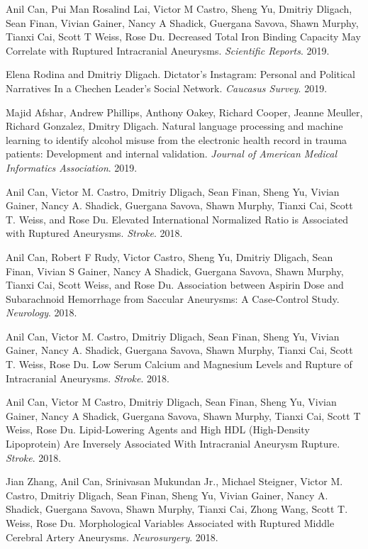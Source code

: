 \documentclass[letterpaper]{article}
\renewenvironment{itemize}{
  \begin{list}{}{
    \setlength{\leftmargin}{1.5em}
  }
}{
  \end{list}
}
\begin{document}
\begin{itemize}
\item Anil Can, Pui Man Rosalind Lai, Victor M Castro, Sheng Yu, Dmitriy Dligach, Sean Finan, Vivian Gainer, Nancy A Shadick, Guergana Savova, Shawn Murphy, Tianxi Cai, Scott T Weiss, Rose Du. Decreased Total Iron Binding Capacity May Correlate with Ruptured Intracranial Aneurysms. \emph{Scientific Reports}. 2019.
\item Elena Rodina and Dmitriy Dligach. Dictator's Instagram: Personal and Political Narratives In a Chechen Leader's Social Network. \emph{Caucasus Survey}. 2019.
\item Majid Afshar, Andrew Phillips, Anthony Oakey, Richard Cooper, Jeanne Meuller, Richard Gonzalez, Dmitry Dligach. Natural language processing and machine learning to identify alcohol misuse from the electronic health record in trauma patients: Development and internal validation. \emph{Journal of American Medical Informatics Association}. 2019.
\item Anil Can, Victor M. Castro, Dmitriy Dligach, Sean Finan, Sheng Yu, Vivian Gainer, Nancy A. Shadick, Guergana Savova, Shawn Murphy, Tianxi Cai, Scott T. Weiss, and Rose Du. Elevated International Normalized Ratio is Associated with Ruptured Aneurysms. \emph{Stroke}. 2018.
\item Anil Can, Robert F Rudy, Victor Castro, Sheng Yu, Dmitriy Dligach, Sean Finan, Vivian S Gainer, Nancy A Shadick, Guergana Savova, Shawn Murphy, Tianxi Cai, Scott Weiss, and Rose Du. Association between Aspirin Dose and Subarachnoid Hemorrhage from Saccular Aneurysms: A Case-Control Study. \emph{Neurology}. 2018.
\item Anil Can, Victor M. Castro, Dmitriy Dligach, Sean Finan, Sheng Yu, Vivian Gainer, Nancy A. Shadick, Guergana Savova, Shawn Murphy, Tianxi Cai, Scott T. Weiss, Rose Du. Low Serum Calcium and Magnesium Levels and Rupture of Intracranial Aneurysms. \emph{Stroke}. 2018.
\item Anil Can, Victor M Castro, Dmitriy Dligach, Sean Finan, Sheng Yu, Vivian Gainer, Nancy A Shadick, Guergana Savova, Shawn Murphy, Tianxi Cai, Scott T Weiss, Rose Du. Lipid-Lowering Agents and High HDL (High-Density Lipoprotein) Are Inversely Associated With Intracranial Aneurysm Rupture. \emph{Stroke}. 2018.
\item Jian Zhang, Anil Can, Srinivasan Mukundan Jr., Michael Steigner, Victor M. Castro, Dmitriy Dligach, Sean Finan, Sheng Yu, Vivian Gainer, Nancy A. Shadick, Guergana Savova, Shawn Murphy, Tianxi Cai, Zhong Wang, Scott T. Weiss, Rose Du. Morphological Variables Associated with Ruptured Middle Cerebral Artery Aneurysms. \emph{Neurosurgery}. 2018.

\end{itemize}
\end{document}
